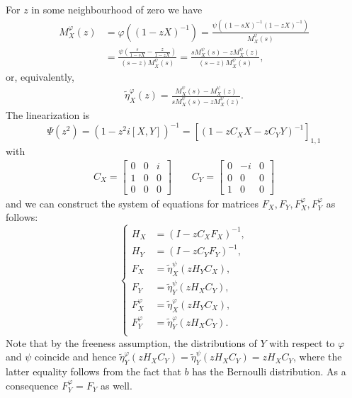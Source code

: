 \documentclass[12pt]{amsart}
\theoremstyle{definition}
\numberwithin{equation}{section}
\begin{document}
For $z$ in some neighbourhood of zero we have
\begin{align*}
  M_X^{\varphi}(z)&=\varphi\left((1-zX)^{-1}\right)=\frac{\psi\left((1-sX)^{-1}(1-zX)^{-1}\right)}{M_X^{\psi}(s)}\\
                  &=\frac{\psi\left(\frac{s}{1-s X}-\frac{z}{1-z X}\right)}{(s-z)M_X^{\psi}(s)}=\frac{sM_X^\psi(s)- zM_X^\psi(z)}{(s-z)M_X^\psi(s)},
\end{align*}
or,  equivalently,
\begin{align}\label{eqn:61}
  \tilde{\eta}^{\varphi}_X(z)=\frac{M^{\psi}_X(s)-M_X^{\psi}(z)}{sM^{\psi}_X(s)-zM_X^{\psi}(z)}.
\end{align}
The linearization is
\[\Psi(z^2)=(1-z^2 i[X,Y])^{-1}=\left[(1-z C_X X-z C_Y Y)^{-1}\right]_{1,1} \]
with
\begin{align*}
  C_X=
  \begin{bmatrix}
    0&0&i\\
    1&0&0\\
    0&0&0
  \end{bmatrix}
         \qquad
         C_Y=
         \begin{bmatrix}
           0&-i&0\\
           0&0&0\\
           1&0&0
         \end{bmatrix}
\end{align*} 
and  we can construct the system of equations for matrices $F_X,F_Y,F_X^{\varphi}, F_Y^{\varphi}$ as follows:
\begin{equation*}
  \label{eq:cfree:systemFXHX}
  \begin{cases}
    H_X&=(I-z C_X F_X)^{-1},\\
    H_Y&=(I-z C_Y F_Y)^{-1},\\
    F_X&=\tilde{\eta}^{\psi}_X(z H_Y C_X),\\
    F_Y&=\tilde{\eta}^{\psi}_Y(z H_X C_Y),\\
    F_X^{\varphi}&=\tilde{\eta}_X^{\varphi}(z H_Y C_X),\\
    F_Y^{\varphi}&=\tilde{\eta}_Y^{\varphi}(z H_X C_Y).\\
  \end{cases}
\end{equation*}
Note that by the freeness assumption, the distributions of  $Y$ with respect to
$\varphi$ and $\psi$ coincide and hence
$\tilde{\eta}^{\varphi}_Y(z H_X C_Y)=\tilde{\eta}^{\psi}_Y(z H_X C_Y)=zH_X
C_Y$,
where the latter equality follows from the fact that $b$ has the Bernoulli
distribution.
As a consequence $F_Y^{\varphi}=F_Y$ as well.
\end{document}
